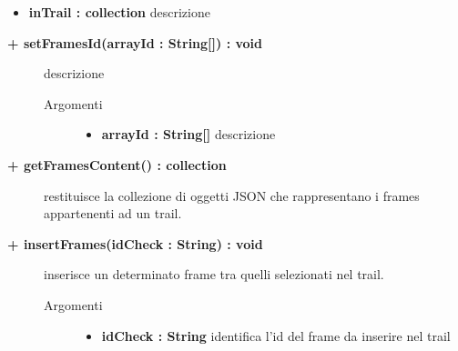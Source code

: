 \begin{description}
\begin{description}
\begin{description}
\begin{itemize}
					\item \textbf{inTrail : collection			} \hfill
					descrizione %
					
				\end{itemize}
		\end{description}
	\end{description}
	
	\begin{description}
		\item[\textbf{\color{blue}+ setFramesId(arrayId : String[]) : void			}] \hfill
			descrizione %
			
		\begin{description}
			\item[Argomenti] \hfill
				\begin{itemize}
				
					\item \textbf{arrayId : String[]			} \hfill
					descrizione %
					
				\end{itemize}
		\end{description}
	\end{description}
	
	\begin{description}
		\item[\textbf{\color{blue}+ getFramesContent() : collection			}] \hfill
			restituisce la collezione di oggetti JSON che rappresentano i frames appartenenti ad un trail.
			
	\end{description}
	
	\begin{description}
		\item[\textbf{\color{blue}+ insertFrames(idCheck : String) : void			}] \hfill
			inserisce un determinato frame tra quelli selezionati nel trail.
			
		\begin{description}
			\item[Argomenti] \hfill
				\begin{itemize}
				
					\item \textbf{idCheck : String			} \hfill
						identifica l'id del frame da inserire nel trail
					

\end{itemize}
\end{description}
\end{description}
\end{description}
